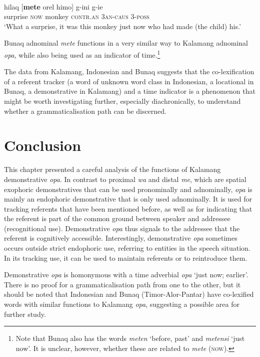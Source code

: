 \documentclass[output=paper,colorlinks,citecolor=brown]{langscibook}
\begin{document}
\ea \label{exe:mete}
\\
\gll hilaq [\textbf{mete} orel himo] g-ini g-ie\\
surprise \textsc{now} monkey \textsc{contr.an} \textsc{3an-caus} \textsc{3-poss}\\
\glt `What a surprise, it was this monkey just now who had made (the child) his.'
\z 		

Bunaq adnominal \textit{mete} functions in a very similar way to Kalamang adnominal \textit{opa}, while also being used as an indicator of time.\footnote{Note that Bunaq also has the words \textit{meten} `before, past' and \textit{metensi} `just now'. It is unclear, however, whether these are related to \textit{mete} (\textsc{now}).}

The data from Kalamang, Indonesian and Bunaq suggests that the co-lexification of a referent tracker (a word of unknown word class in Indonesian, a locational in Bunaq, a demonstrative in Kalamang) and a time indicator is a phenomenon that might be worth investigating further, especially diachronically, to understand whether a grammaticalisation path can be discerned.

\section{Conclusion}
\label{sec:concl}
This chapter presented a careful analysis of the functions of Kalamang demonstrative \textit{opa}. In contrast to proximal \textit{wa} and distal \textit{me}, which are spatial exophoric demonstratives that can be used pronominally and adnominally, \textit{opa} is mainly an endophoric demonstrative that is only used adnominally. It is used for tracking referents that have been mentioned before, as well as for indicating that the referent is part of the common ground between speaker and addressee (recognitional use). Demonstrative \textit{opa} thus signals to the addressee that the referent is cognitively accessible. Interestingly, demonstrative \textit{opa} sometimes occurs outside strict endophoric use, referring to entities in the speech situation. In its tracking use, it can be used to maintain referents or to reintroduce them.

Demonstrative \textit{opa} is homonymous with a time adverbial \textit{opa} `just now; earlier'. There is no proof for a grammaticalisation path from one to the other, but it should be noted that Indonesian and Bunaq (Timor-Alor-Pantar) have co-lexified words with similar functions to Kalamang \textit{opa}, suggesting a possible area for further study.
\end{document}

